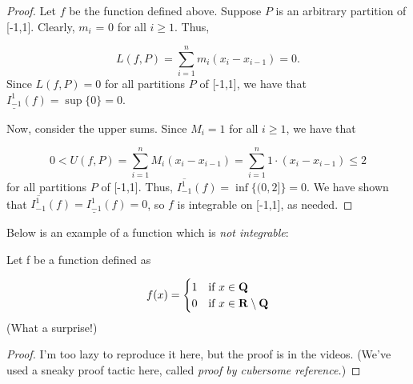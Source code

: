 \documentclass{article}
\begin{document}
  \begin{proof}
    Let \(f\) be the function defined above. Suppose \(P\) is an arbitrary partition of [-1,1]. Clearly, \(m_i\) = 0 for all \(i \geq 1\). Thus,

    \[
      L(f,P) = \sum_{i = 1}^{n}{m_i(x_i - x_{i-1})} = 0.
    \]
    Since \(L(f,P) = 0\) for all partitions \(P\) of [-1,1], we have that \(\underline{I_{-1}^{1}}(f) = \sup\{0\} = 0\).

    Now, consider the upper sums. Since \(M_i = 1\) for all \(i \geq 1\), we have that

    \[
      0 < U(f,P) = \sum_{i = 1}^{n}{M_i(x_i - x_{i-1})} = \sum_{i = 1}^{n}{1 \cdot (x_i - x_{i-1})} \leq 2
    \]
    for all partitions \(P\) of [-1,1]. Thus, \(\overline{I_{-1}^{1}}(f) = \inf\{(0,2]\} = 0\).
    \vspace*{5pt}
    We have shown that \(\overline{I_{-1}^{1}}(f) = \underline{I_{-1}^{1}}(f) = 0\), so \(f\) is integrable on [-1,1], as needed.
  \end{proof}

  Below is an example of a function which is \emph{not integrable}:

  \begin{eg}
    Let f be a function defined as 

    \[
      f(x) = \begin{cases}
        1 & \text{if } x \in \mathbf{Q} \\
        0 & \text{if } x \in \mathbf{R} \setminus \mathbf{Q}
      \end{cases}
    \]
    (What a surprise!)

    \begin{proof}
      I'm too lazy to reproduce it here, but the proof is in the videos. (We've used a sneaky proof tactic here, called \emph{proof by cubersome reference.})
    \end{proof}
    
  \end{eg} 
\end{document}
